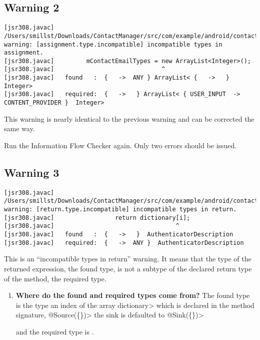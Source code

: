  \subsection{Warning 2}
 \begin{Verbatim}
[jsr308.javac] /Users/smillst/Downloads/ContactManager/src/com/example/android/contactmanager/ContactAdder.java:101: warning: [assignment.type.incompatible] incompatible types in assignment.
[jsr308.javac]         mContactEmailTypes = new ArrayList<Integer>();
[jsr308.javac]                              ^
[jsr308.javac]   found   :  {   ->  ANY } ArrayList< {   ->   }  Integer>
[jsr308.javac]   required:  {   ->   } ArrayList< { USER_INPUT  ->  CONTENT_PROVIDER }  Integer>
\end{Verbatim} 
This warning is nearly identical to the previous warning and can be corrected the same way.
 
   Run the Information Flow Checker again.  Only two errors should be issued.


  \subsection{Warning 3 }
   \begin{Verbatim}
[jsr308.javac] /Users/smillst/Downloads/ContactManager/src/com/example/android/contactmanager/ContactAdder.java:282: warning: [return.type.incompatible] incompatible types in return.
[jsr308.javac]                 return dictionary[i];
[jsr308.javac]                                  ^
[jsr308.javac]   found   :  {   ->   }  AuthenticatorDescription
[jsr308.javac]   required:  {   ->  ANY }  AuthenticatorDescription
\end{Verbatim} 
This is an ``incompatible types in return'' warning.  It means that the type
of the returned expression, the found type, is not a subtype of the declared  
return type of the method, the required type.

 \begin{enumerate}

\item\textbf{Where do the found and required types come from?}
 The found type is the type an index of the array \<dictionary> which is declared in the method signature, \<@Source(\{\})> the sink is defaulted to \<@Sink(\{\})>
 
 and the required type is .


 \end{enumerate}

